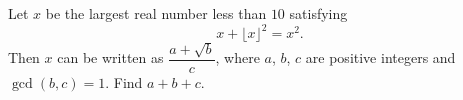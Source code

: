 Let $x$ be the largest real number less than $10$ satisfying
\[x+\lfloor x\rfloor^2=x^2.\]
Then $x$ can be written as $\dfrac{a+\sqrt b}{c}$, where $a$, $b$, $c$ are positive integers and $\gcd(b,c)=1$. Find $a+b+c$.
